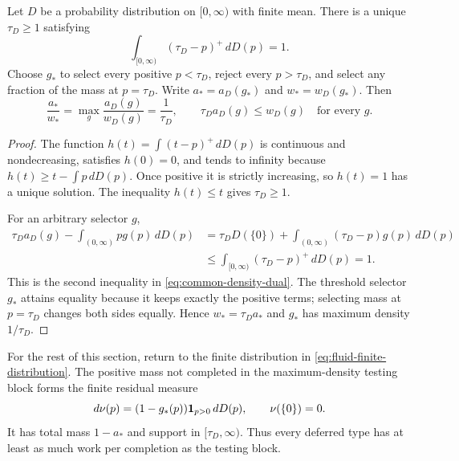 \begin{lemma}
\label{lem:maximum-density-module}
Let $D$ be a probability distribution on $[0,\infty)$ with finite mean.
There is a unique $\tau_D\ge1$ satisfying
\begin{equation}
 \int_{[0,\infty)}(\tau_D-p)^+\,dD(p)=1.
 \label{eq:common-threshold-equation}
\end{equation}
Choose $g_*$ to select every positive $p<\tau_D$, reject every
$p>\tau_D$, and select any fraction of the mass at $p=\tau_D$.  Write
$a_*=a_D(g_*)$ and $w_*=w_D(g_*)$.  Then
\begin{equation}
 \frac{a_*}{w_*}=\max_g\frac{a_D(g)}{w_D(g)}=\frac1{\tau_D},
 \qquad
 \tau_D a_D(g)\le w_D(g)\quad\text{for every }g.
 \label{eq:common-density-dual}
\end{equation}
\end{lemma}

\begin{proof}
The function
$h(t)=\int(t-p)^+\,dD(p)$ is continuous and nondecreasing, satisfies
$h(0)=0$, and tends to infinity because
$h(t)\ge t-\int p\,dD(p)$.  Once positive it is strictly increasing, so
$h(t)=1$ has a unique solution.  The inequality $h(t)\le t$ gives
$\tau_D\ge1$.

For an arbitrary selector $g$,
\[
 \begin{aligned}
  \tau_D a_D(g)-\int_{(0,\infty)}p g(p)\,dD(p)
   &=\tau_D D(\{0\})
     +\int_{(0,\infty)}(\tau_D-p)g(p)\,dD(p)\\
   &\le\int_{[0,\infty)}(\tau_D-p)^+\,dD(p)=1.
 \end{aligned}
\]
This is the second inequality in \cref{eq:common-density-dual}.  The
threshold selector $g_*$ attains equality because it keeps exactly the
positive terms; selecting mass at $p=\tau_D$ changes both sides equally.
Hence $w_*=\tau_Da_*$ and $g_*$ has maximum density $1/\tau_D$.
\end{proof}

For the rest of this section, return to the finite distribution in
\cref{eq:fluid-finite-distribution}.
The positive mass not completed in the maximum-density testing block forms
the finite residual measure
\begin{equation}
 d\nu(p)=(1-g_*(p))\mathbf{1}_{p>0}\,dD(p),
 \qquad \nu(\{0\})=0.
 \label{eq:common-module-data}
\end{equation}
It has total mass $1-a_*$ and support in $[\tau_D,\infty)$.  Thus every
deferred type has at least as much work per completion as the testing block.

